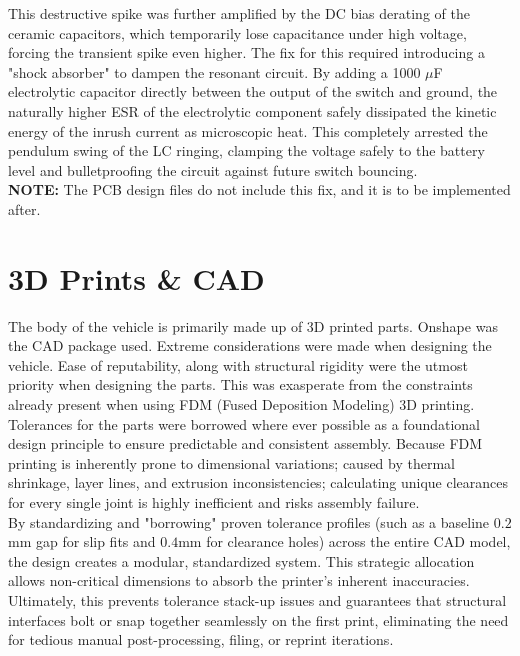 \documentclass[12pt,a4paper]{article}
\begin{document}
This destructive spike was further amplified by the DC bias derating of the ceramic capacitors, which temporarily lose capacitance under high voltage, forcing the transient spike even higher. The fix for this required introducing a "shock absorber" to dampen the resonant circuit. By adding a 1000 $\mu$F electrolytic capacitor directly between the output of the switch and ground, the naturally higher ESR of the electrolytic component safely dissipated the kinetic energy of the inrush current as microscopic heat. This completely arrested the pendulum swing of the LC ringing, clamping the voltage safely to the battery level and bulletproofing the circuit against future switch bouncing. \\

\textbf{NOTE:} The PCB design files do not include this fix, and it is to be implemented after.

\pagebreak

\section{3D Prints \& CAD}

The body of the vehicle is primarily made up of 3D printed parts. Onshape was the CAD package used. Extreme considerations were made when designing the vehicle. Ease of reputability, along with structural rigidity were the utmost priority when designing the parts. This was exasperate from the constraints already present when using FDM (Fused Deposition Modeling) 3D printing. \\

Tolerances for the parts were borrowed where ever possible as a foundational design principle to ensure predictable and consistent assembly. Because FDM printing is inherently prone to dimensional variations; caused by thermal shrinkage, layer lines, and extrusion inconsistencies; calculating unique clearances for every single joint is highly inefficient and risks assembly failure. \\

By standardizing and "borrowing" proven tolerance profiles (such as a baseline $0.2$mm gap for slip fits and $0.4$mm for clearance holes) across the entire CAD model, the design creates a modular, standardized system. This strategic allocation allows non-critical dimensions to absorb the printer's inherent inaccuracies. Ultimately, this prevents tolerance stack-up issues and guarantees that structural interfaces bolt or snap together seamlessly on the first print, eliminating the need for tedious manual post-processing, filing, or reprint iterations. \\
\end{document}
